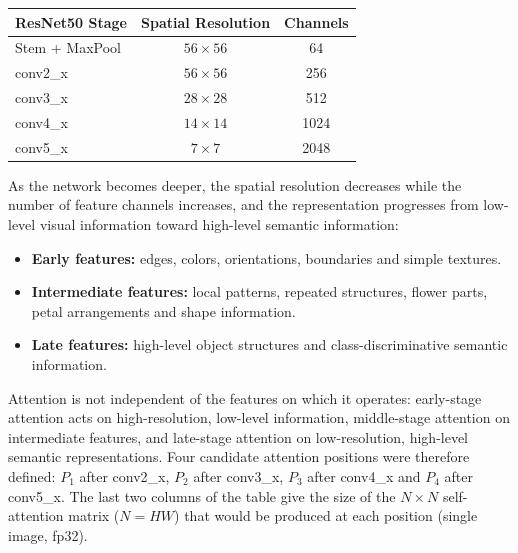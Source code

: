 \documentclass[10pt]{article}
\begin{document}
\begin{center}

\begin{tabular}{|l|c|c|}
\hline
\textbf{ResNet50 Stage}
&
\textbf{Spatial Resolution}
&
\textbf{Channels}
\\
\hline

Stem + MaxPool
&
$56\times56$
&
64
\\
\hline

conv2\_x
&
$56\times56$
&
256
\\
\hline

conv3\_x
&
$28\times28$
&
512
\\
\hline

conv4\_x
&
$14\times14$
&
1024
\\
\hline

conv5\_x
&
$7\times7$
&
2048
\\
\hline

\end{tabular}

\end{center}

As the network becomes deeper, the spatial resolution decreases while the
number of feature channels increases, and the representation progresses from
low-level visual information toward high-level semantic information:

\begin{itemize}
\item \textbf{Early features:} edges, colors, orientations, boundaries and simple textures.
\item \textbf{Intermediate features:} local patterns, repeated structures, flower parts, petal arrangements and shape information.
\item \textbf{Late features:} high-level object structures and class-discriminative semantic information.
\end{itemize}

Attention is not independent of the features on which it operates: early-stage
attention acts on high-resolution, low-level information, middle-stage
attention on intermediate features, and late-stage attention on
low-resolution, high-level semantic representations. Four candidate
attention positions were therefore defined: $P_1$ after conv2\_x, $P_2$
after conv3\_x, $P_3$ after conv4\_x and $P_4$ after conv5\_x. The last two
columns of the table give the size of the $N\times N$ self-attention matrix
($N=HW$) that would be produced at each position (single image, fp32).
\end{document}
